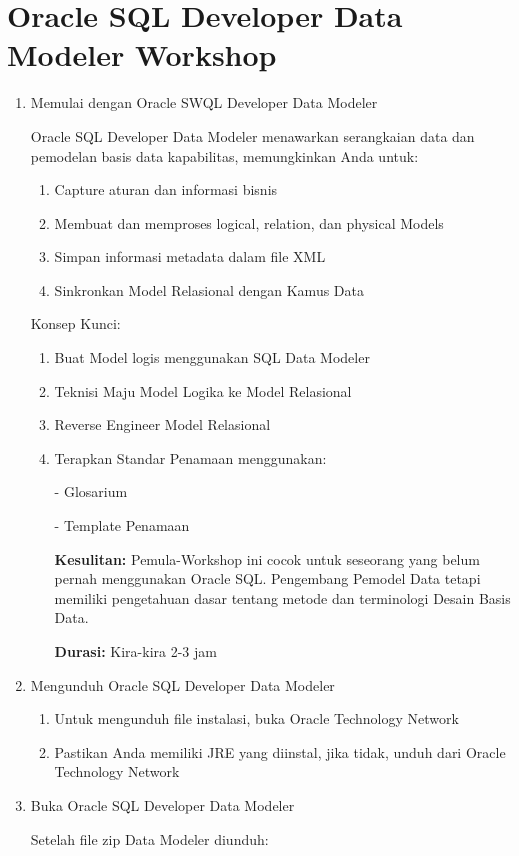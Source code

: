 \documentclass[12pt, times new roman, a4paper]{article}
\begin{document}
\section{Oracle SQL Developer Data Modeler Workshop}
\begin{enumerate}
\item Memulai dengan Oracle SWQL Developer Data Modeler
\par Oracle SQL Developer Data Modeler menawarkan serangkaian data dan pemodelan basis data kapabilitas, memungkinkan Anda untuk:
\begin{enumerate}
\item Capture aturan dan informasi bisnis
\item Membuat dan memproses logical, relation, dan physical Models
\item Simpan informasi metadata dalam file XML
\item Sinkronkan Model Relasional dengan Kamus Data
\end{enumerate}
\par Konsep Kunci:
\begin{enumerate}
\item Buat Model logis menggunakan SQL Data Modeler
\item Teknisi Maju Model Logika ke Model Relasional
\item Reverse Engineer Model Relasional
\item Terapkan Standar Penamaan menggunakan:
\par - Glosarium
\par - Template Penamaan
\par\textbf{Kesulitan:} Pemula-Workshop ini cocok untuk seseorang yang belum pernah menggunakan Oracle SQL. Pengembang Pemodel Data tetapi memiliki pengetahuan dasar tentang metode dan terminologi Desain Basis Data.
\par \textbf{Durasi:} Kira-kira 2-3 jam
\end{enumerate}
\item Mengunduh Oracle SQL Developer Data Modeler
\begin{enumerate}
\item Untuk mengunduh file instalasi, buka Oracle Technology Network
\item Pastikan Anda memiliki JRE yang diinstal, jika tidak, unduh dari Oracle Technology Network
\end{enumerate}
\item Buka Oracle SQL Developer Data Modeler
\par Setelah file zip Data Modeler diunduh:

\end{enumerate}
\end{document}
